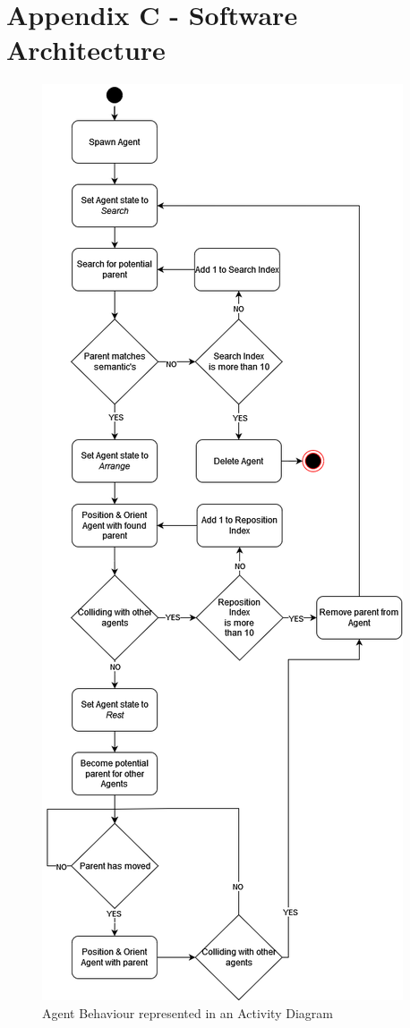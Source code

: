 \section*{Appendix C - Software Architecture} \label{append:c}
\begin{figure}[!h]
    \includegraphics[width=\columnwidth]{./Images/AgentActivityDiagram.png}
    \centering
    \caption{Agent Behaviour represented in an Activity Diagram}
    \label{activity-diagram}
\end{figure}

